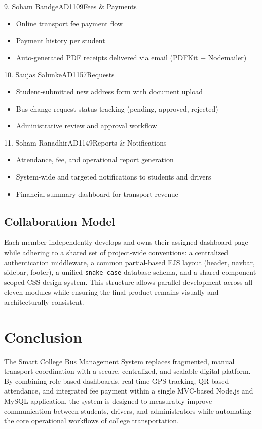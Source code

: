 \documentclass[11pt,a4paper]{report}
\begin{document}
\begin{membercard}{9. Soham Bandge}{AD1109}{Fees \& Payments}
\begin{itemize}[leftmargin=1.2em, itemsep=1pt]
  \item Online transport fee payment flow
  \item Payment history per student
  \item Auto-generated PDF receipts delivered via email (PDFKit + Nodemailer)
\end{itemize}
\end{membercard}

\begin{membercard}{10. Saujas Salunke}{AD1157}{Requests}
\begin{itemize}[leftmargin=1.2em, itemsep=1pt]
  \item Student-submitted new address form with document upload
  \item Bus change request status tracking (pending, approved, rejected)
  \item Administrative review and approval workflow
\end{itemize}
\end{membercard}

\begin{membercard}{11. Soham Ranadhir}{AD1149}{Reports \& Notifications}
\begin{itemize}[leftmargin=1.2em, itemsep=1pt]
  \item Attendance, fee, and operational report generation
  \item System-wide and targeted notifications to students and drivers
  \item Financial summary dashboard for transport revenue
\end{itemize}
\end{membercard}

\section{Collaboration Model}
Each member independently develops and owns their assigned dashboard page while adhering to a shared set of project-wide conventions: a centralized authentication middleware, a common partial-based EJS layout (header, navbar, sidebar, footer), a unified \texttt{snake\_case} database schema, and a shared component-scoped CSS design system. This structure allows parallel development across all eleven modules while ensuring the final product remains visually and architecturally consistent.

\chapter{Conclusion}
The Smart College Bus Management System replaces fragmented, manual transport coordination with a secure, centralized, and scalable digital platform. By combining role-based dashboards, real-time GPS tracking, QR-based attendance, and integrated fee payment within a single MVC-based Node.js and MySQL application, the system is designed to measurably improve communication between students, drivers, and administrators while automating the core operational workflows of college transportation.
\end{document}
